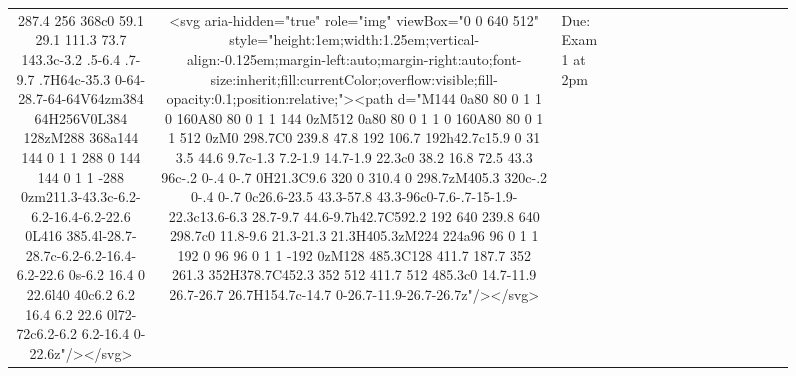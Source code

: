 \documentclass[
]{article}
\begin{document}
\begin{figure*}
\begin{longtable*}{cclllccccccccccl}
287.4 256 368c0 59.1 29.1 111.3 73.7 143.3c-3.2 .5-6.4 .7-9.7 .7H64c-35.3 0-64-28.7-64-64V64zm384 64H256V0L384 128zM288 368a144 144 0 1 1 288 0 144 144 0 1 1 -288 0zm211.3-43.3c-6.2-6.2-16.4-6.2-22.6 0L416 385.4l-28.7-28.7c-6.2-6.2-16.4-6.2-22.6 0s-6.2 16.4 0 22.6l40 40c6.2 6.2 16.4 6.2 22.6 0l72-72c6.2-6.2 6.2-16.4 0-22.6z"/></svg> & <svg aria-hidden="true" role="img" viewBox="0 0 640 512" style="height:1em;width:1.25em;vertical-align:-0.125em;margin-left:auto;margin-right:auto;font-size:inherit;fill:currentColor;overflow:visible;fill-opacity:0.1;position:relative;"><path d="M144 0a80 80 0 1 1 0 160A80 80 0 1 1 144 0zM512 0a80 80 0 1 1 0 160A80 80 0 1 1 512 0zM0 298.7C0 239.8 47.8 192 106.7 192h42.7c15.9 0 31 3.5 44.6 9.7c-1.3 7.2-1.9 14.7-1.9 22.3c0 38.2 16.8 72.5 43.3 96c-.2 0-.4 0-.7 0H21.3C9.6 320 0 310.4 0 298.7zM405.3 320c-.2 0-.4 0-.7 0c26.6-23.5 43.3-57.8 43.3-96c0-7.6-.7-15-1.9-22.3c13.6-6.3 28.7-9.7 44.6-9.7h42.7C592.2 192 640 239.8 640 298.7c0 11.8-9.6 21.3-21.3 21.3H405.3zM224 224a96 96 0 1 1 192 0 96 96 0 1 1 -192 0zM128 485.3C128 411.7 187.7 352 261.3 352H378.7C452.3 352 512 411.7 512 485.3c0 14.7-11.9 26.7-26.7 26.7H154.7c-14.7 0-26.7-11.9-26.7-26.7z"/></svg> & Due: Exam 1 at 2pm \\ 

\end{longtable*}
\end{figure*}
\end{document}
